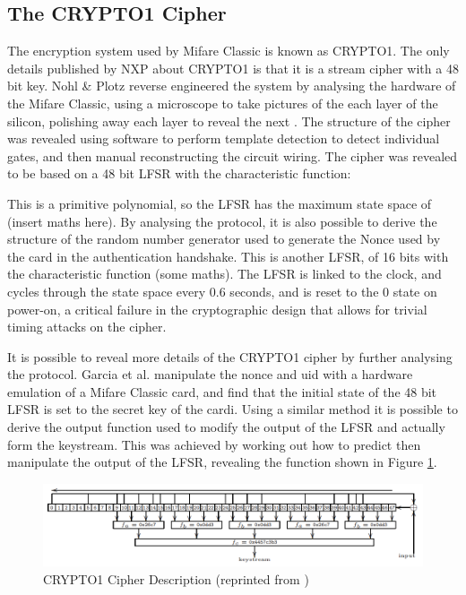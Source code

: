 \documentclass[pdflatex, a4paper,12pt]{article}
\begin{document}
\subsection{The CRYPTO1 Cipher}

The encryption system used by Mifare Classic is known as CRYPTO1. The only
details published by NXP about CRYPTO1 is that it is a stream cipher with a
48 bit key. Nohl \& Plotz reverse engineered the system by analysing the
hardware of the Mifare Classic, using a microscope to take pictures of the
each layer of the silicon, polishing away each layer to reveal the next
\cite{nohl_reverse-engineering_????}. The
structure of the cipher was revealed using software to perform template
detection to detect individual gates, and then manual reconstructing the circuit
wiring. The cipher was revealed to be based on a 48 bit LFSR with the
characteristic function:


This is a primitive polynomial, so the LFSR has the maximum state space of
(insert maths here). By analysing the protocol, it is also possible to derive
the structure of the random number generator used to generate the Nonce used by
the card in the authentication handshake. This is another LFSR, of 16 bits with
the characteristic function (some maths). The LFSR is linked to the clock, and
cycles through the state space every 0.6 seconds, and is reset to the 0 state on
power-on, a critical failure in the cryptographic design that allows for trivial
timing attacks on the cipher.

It is possible to reveal more details of the CRYPTO1 cipher by further
analysing the protocol. Garcia et al. manipulate the nonce and uid with a
hardware emulation of a Mifare Classic card, and find that the initial state of
the 48 bit LFSR is set to the secret key of the cardi\cite{garcia_dismantling_2008}.
Using a similar method it
is possible to derive the output function used to modify the output of the LFSR and
actually form the keystream. This was achieved by working out how to predict
then manipulate the output of the LFSR, revealing the function shown in Figure
\ref{fig:crypto1}.

\begin{figure}[htb]
\centering
\includegraphics[width=\textwidth]{img/crypto1.png}
\caption{CRYPTO1 Cipher Description (reprinted from
\protect\cite{garcia_dismantling_2008})}
\label{fig:crypto1}
\end{figure}
\end{document}
